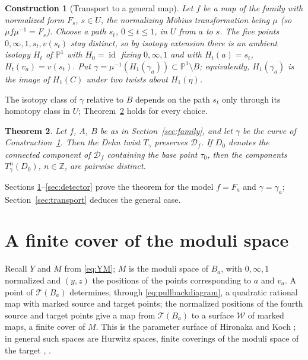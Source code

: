 \documentclass[12pt]{article}
\newcommand{\Pone}{\mathbb P^1}
\newcommand{\Z}{\mathbb Z}
\newcommand{\Teich}{\mathcal T}
\newcommand{\D}{\mathcal D}
\newcommand{\W}{\mathcal W}
\newcommand{\id}{\operatorname{id}}
\newtheorem{theorem}{Theorem}[section]
\newtheorem{construction}[theorem]{Construction}
\theoremstyle{remark}
\numberwithin{equation}{section}
\begin{document}
\begin{construction}[Transport to a general map]\label{con:transport}
Let $f$ be a map of the family with normalized form $F_s$, $s\in U$, the
normalizing M\"obius transformation being $\mu$ (so $\mu f\mu^{-1}=F_s$).
Choose a path $s_t$, $0\le t\le1$, in $U$ from $a$ to $s$. The five points
$0,\infty,1,s_t,v(s_t)$ stay distinct, so by isotopy extension there is an
ambient isotopy $H_t$ of $\Pone$ with $H_0=\id$ fixing $0,\infty,1$ and
with $H_t(a)=s_t$, $H_t(v_a)=v(s_t)$. Put
$\gamma=\mu^{-1}(H_1(\gamma_a))\subset\Pone\setminus B$; equivalently,
$H_1(\gamma_a)$ is the image of $H_1(C)$ under two twists about $H_1(\eta)$.
\end{construction}

The isotopy class of $\gamma$ relative to $B$ depends on the path $s_t$
only through its homotopy class in $U$; Theorem~\ref{thm:main} holds for
every choice.

\begin{theorem}\label{thm:main}
Let $f$, $A$, $B$ be as in Section~\ref{sec:family}, and let
$\gamma$ be the curve of Construction~\ref{con:transport}. Then the Dehn
twist $T_\gamma$ preserves $\D_f$. If $D_0$ denotes the connected component
of $\D_f$ containing the base point $\tau_0$, then the components
$T_\gamma^{n}(D_0)$, $n\in\Z$, are pairwise distinct.
\end{theorem}

Sections \ref{sec:covering}--\ref{sec:detector} prove the theorem for the
model $f=F_a$ and $\gamma=\gamma_a$; Section~\ref{sec:transport} deduces
the general case.

\section{A finite cover of the moduli space}\label{sec:covering}

Recall $Y$ and $M$ from \eqref{eq:YM}; $M$ is the moduli space of
$B_a$, with $0,\infty,1$ normalized and $(y,z)$ the positions of the points
corresponding to $a$ and $v_a$. A point of $\Teich(B_a)$ determines,
through \eqref{eq:pullbackdiagram}, a quadratic rational map with marked
source and target points; the normalized positions of the fourth source and
target points give a map from $\Teich(B_a)$ to a surface $\W$ of marked
maps, a finite cover of $M$. This is the parameter surface of Hironaka and
Koch \cite[\S\S4.1--4.2]{HKa}; in general such spaces are Hurwitz spaces,
finite coverings of the moduli space of the target \cite[Thm.\ 2.6]{Ko},
\cite[\S3.1]{KPS}.
\end{document}
